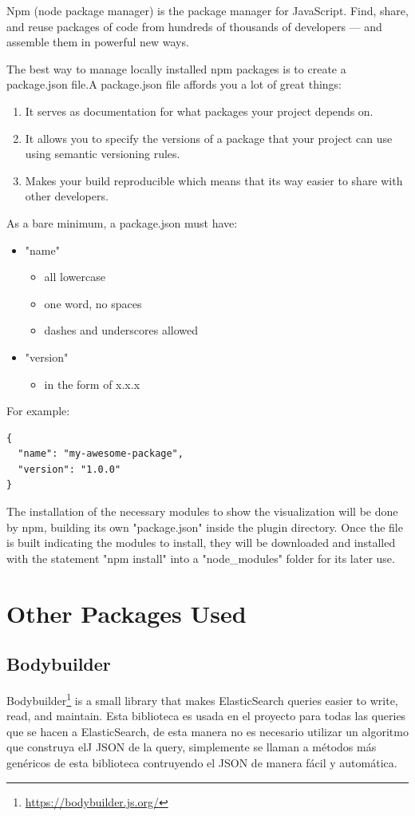 \documentclass[a4paper, 12pt]{book}
\begin{document}
Npm (node package manager) is the package manager for JavaScript. Find, share, and reuse packages of code from hundreds of thousands of developers — and assemble them in powerful new ways. 

The best way to manage locally installed npm packages is to create a package.json file.A package.json file affords you a lot of great things:
\begin{enumerate}
\item It serves as documentation for what packages your project depends on.
\item It allows you to specify the versions of a package that your project can use using semantic versioning rules.
\item Makes your build reproducible which means that its way easier to share with other developers.
\end{enumerate}

As a bare minimum, a package.json must have:
\begin{itemize}
\item "name"
\begin{itemize}
\item all lowercase
\item one word, no spaces
\item dashes and underscores allowed
\end{itemize}
\item "version"
\begin{itemize}
\item in the form of x.x.x
\end{itemize}
\end{itemize}

For example:
\begin{lstlisting}[frame=single]
{
  "name": "my-awesome-package",
  "version": "1.0.0"
}
\end{lstlisting}

The installation of the necessary modules to show the visualization will be done by npm, building its own "package.json" inside the plugin directory.  Once the file is built indicating the modules to install, they will be downloaded and installed with the statement "npm install" into a "node\_modules" folder for its later use.

\section{Other Packages Used}
\label{sec:otherspackage}
\subsection{Bodybuilder}
Bodybuilder\footnote{\url{https://bodybuilder.js.org/}} is a small library that makes ElasticSearch queries easier to write, read, and maintain. Esta biblioteca es usada en el proyecto para todas las queries que se hacen a ElasticSearch, de esta manera no es necesario utilizar un algoritmo que construya elJ JSON de la query, simplemente se llaman a métodos más genéricos de esta biblioteca contruyendo el JSON de manera fácil y automática.
\end{document}
